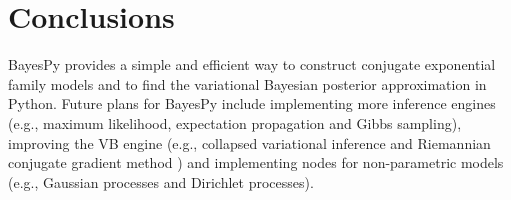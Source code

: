\documentclass[twoside,11pt]{article}
\begin{document}

\section{Conclusions}

BayesPy provides a simple and efficient way to construct conjugate exponential
family models and to find the variational Bayesian posterior approximation in
Python.
%
Future plans for BayesPy include implementing more inference engines (e.g.,
maximum likelihood, expectation propagation and Gibbs sampling), improving the
VB engine (e.g., collapsed variational inference \citep{Hensman:2012} and
Riemannian conjugate gradient method \citep{Honkela:2010}) and implementing nodes
for non-parametric models (e.g., Gaussian processes and Dirichlet processes).







\vskip 0.2in

\end{document}
